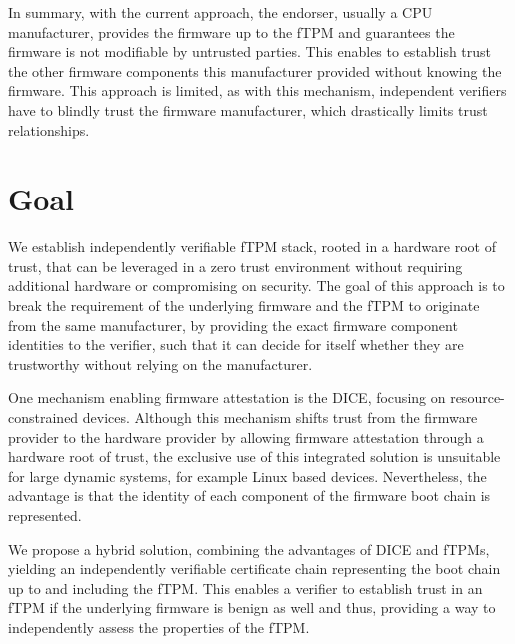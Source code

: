 
In summary, with the current approach, the endorser, usually a CPU manufacturer, provides the firmware up to the fTPM and guarantees the firmware is not modifiable by untrusted parties. This enables to establish trust the other firmware components this manufacturer provided without knowing the firmware.
This approach is limited, as with this mechanism, independent verifiers have to blindly trust the firmware manufacturer, which drastically limits trust relationships.

\section{Goal}

We establish independently verifiable fTPM stack, rooted in a hardware root of trust, that can be leveraged in a zero trust environment without requiring additional hardware or compromising on security.
The goal of this approach is to break the requirement of the underlying firmware and the fTPM to originate from the same manufacturer, by providing the exact firmware component identities to the verifier, such that it can decide for itself whether they are trustworthy without relying on the manufacturer.


One mechanism enabling firmware attestation is the \ac{DICE}, focusing on resource-constrained devices. Although this mechanism shifts trust from the firmware provider to the hardware provider by allowing firmware attestation through a hardware root of trust, the exclusive use of this integrated solution is unsuitable for large dynamic systems, for example Linux based devices.
Nevertheless, the advantage is that the identity of each component of the firmware boot chain is represented.


We propose a hybrid solution, combining the advantages of \ac{DICE} and \acp{fTPM}, yielding an independently verifiable certificate chain representing the boot chain up to and including the \ac{fTPM}.
This enables a verifier to establish trust in an \ac{fTPM} if the underlying firmware is benign as well and thus, providing a way to independently assess the properties of the \ac{fTPM}.

